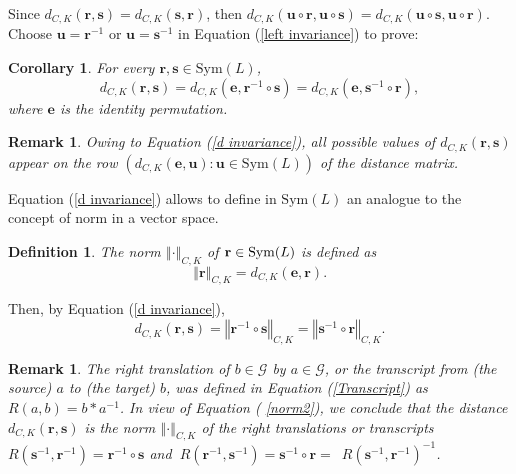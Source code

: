 \documentclass{article}
\newtheorem{corollary}[theorem]{Corollary}
\newtheorem{definition}[theorem]{Definition}
\newtheorem{remark}[theorem]{Remark}
\begin{document}
Since $d_{C,K}(\mathbf{r},\mathbf{s})=d_{C,K}(\mathbf{s},\mathbf{r})$, then $%
d_{C,K}(\mathbf{u}\circ \mathbf{r},\mathbf{u}\circ \mathbf{s})=d_{C,K}(%
\mathbf{u}\circ \mathbf{s},\mathbf{u}\circ \mathbf{r}).$ Choose $\mathbf{u}=%
\mathbf{r}^{-1}$ or $\mathbf{u}=\mathbf{s}^{-1}$ in Equation (\ref{left
invariance}) to prove:

\begin{corollary} \label{PropInvariance2}
For every $\mathbf{r},\mathbf{s}\in \mathrm{Sym}(L)$, 
\begin{equation}
d_{C,K}(\mathbf{r},\mathbf{s})=d_{C,K}(\mathbf{e},\mathbf{r}^{-1}\circ 
\mathbf{s})=d_{C,K}(\mathbf{e},\mathbf{s}^{-1}\circ \mathbf{r}),
\label{d invariance}
\end{equation}%
where $\mathbf{e}$ is the identity permutation.
\end{corollary}

\begin{remark}
\label{RemarkAdmissibleValues1}Owing to Equation (\ref{d invariance}), all
possible values of $d_{C,K}(\mathbf{r},\mathbf{s})$ appear on the row $%
(d_{C,K}(\mathbf{e},\mathbf{u}):\mathbf{u}\in \mathrm{Sym}(L))$ of the
distance matrix.
\end{remark}

Equation (\ref{d invariance}) allows to define in $\mathrm{Sym}(L)$ an
analogue to the concept of norm in a vector space.

\begin{definition}
\label{RemarkNorm}The norm $\left\Vert \cdot \right\Vert _{C,K}$ of $\mathbf{%
r}\in \mathrm{Sym}(L)$ is defined as%
\begin{equation}
\left\Vert \mathbf{r}\right\Vert _{C,K}=d_{C,K}(\mathbf{e},\mathbf{r}).
\label{norm}
\end{equation}
\end{definition}

Then, by Equation (\ref{d invariance}), 
\begin{equation}
d_{C,K}(\mathbf{r},\mathbf{s})=\left\Vert \mathbf{r}^{-1}\circ \mathbf{s}%
\right\Vert _{C,K}=\left\Vert \mathbf{s}^{-1}\circ \mathbf{r}\right\Vert
_{C,K}.  \label{norm2}
\end{equation}

\begin{remark}
The right translation of $b\in \mathcal{G}$ by $a\in \mathcal{G}$, or the
transcript from (the source) $a$ to (the target) $b$, was defined in
Equation (\ref{Transcript}) as $R(a,b)=b\ast a^{-1}$. In view of Equation (%
\ref{norm2}), we conclude that the distance $d_{C,K}(\mathbf{r},\mathbf{s})$
is the norm $\left\Vert \cdot \right\Vert _{C,K}$ of the right translations
or transcripts $R(\mathbf{s}^{-1},\mathbf{r}^{-1})=\mathbf{r}^{-1}\circ 
\mathbf{s}$ and $\ R(\mathbf{r}^{-1},\mathbf{s}^{-1})=\mathbf{s}^{-1}\circ 
\mathbf{r}=$\ $R(\mathbf{s}^{-1},\mathbf{r}^{-1})^{-1}$.
\end{remark}
\end{document}
